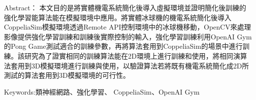 \begin{flushleft}
\timesbi Abstract：\sectionef 
本文目的是將實體機電系統簡化後導入虛擬環境並證明簡化後訓練的強化學習能算法能在模擬環境中應用。將實體冰球機的機電系統簡化後導入CoppeliaSim模擬環境透過Remote API控制環境中的冰球機移動，OpenCV來處理影像提供強化學習訓練和訓練後實際控制的輸入，強化學習訓練利用OpenAI Gym的Pong Game測試適合的訓練參數，再將算法套用到CoppeliaSim的場景中進行訓練。該研究為了證實相同的訓練算法能在2D環境上進行訓練和使用，將相同演算法套用到3D模擬環境進行訓練與使用，以驗證算法若將既有機電系統簡化成2D所測試的算法套用到3D模擬環境的可行性。\\
\end{flushleft}
\begin{flushleft}
\timesbi Keywords:\sectionef 類神經網路、強化學習、 CoppeliaSim、OpenAI Gym
\end{flushleft}
